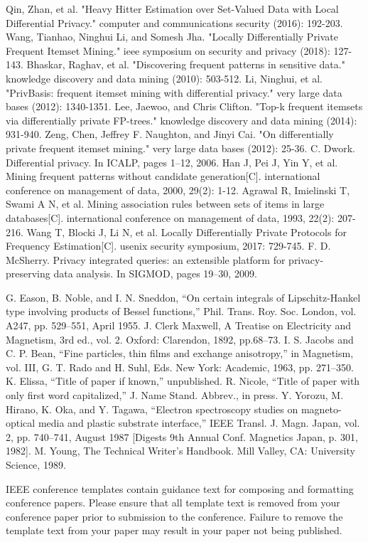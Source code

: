 \documentclass[conference]{IEEEtran}
\begin{document}
\begin{thebibliography}{00}
 Qin, Zhan, et al. "Heavy Hitter Estimation over Set-Valued Data with Local Differential Privacy." computer and communications security (2016): 192-203.
 Wang, Tianhao, Ninghui Li, and Somesh Jha. "Locally Differentially Private Frequent Itemset Mining." ieee symposium on security and privacy (2018): 127-143.
 Bhaskar, Raghav, et al. "Discovering frequent patterns in sensitive data." knowledge discovery and data mining (2010): 503-512.
 Li, Ninghui, et al. "PrivBasis: frequent itemset mining with differential privacy." very large data bases (2012): 1340-1351.
 Lee, Jaewoo, and Chris Clifton. "Top-k frequent itemsets via differentially private FP-trees." knowledge discovery and data mining (2014): 931-940.
 Zeng, Chen, Jeffrey F. Naughton, and Jinyi Cai. "On differentially private frequent itemset mining." very large data bases (2012): 25-36.
 C. Dwork. Differential privacy. In ICALP, pages 1–12, 2006.
 Han J, Pei J, Yin Y, et al. Mining frequent patterns without candidate generation[C]. international conference on management of data, 2000, 29(2): 1-12.
 Agrawal R, Imielinski T, Swami A N, et al. Mining association rules between sets of items in large databases[C]. international conference on management of data, 1993, 22(2): 207-216.
 Wang T, Blocki J, Li N, et al. Locally Differentially Private Protocols for Frequency Estimation[C]. usenix security symposium, 2017: 729-745.
 F. D. McSherry. Privacy integrated queries: an extensible platform for privacy-preserving data
analysis. In SIGMOD, pages 19–30, 2009.


 G. Eason, B. Noble, and I. N. Sneddon, ``On certain integrals of Lipschitz-Hankel type involving products of Bessel functions,'' Phil. Trans. Roy. Soc. London, vol. A247, pp. 529--551, April 1955.
 J. Clerk Maxwell, A Treatise on Electricity and Magnetism, 3rd ed., vol. 2. Oxford: Clarendon, 1892, pp.68--73.
 I. S. Jacobs and C. P. Bean, ``Fine particles, thin films and exchange anisotropy,'' in Magnetism, vol. III, G. T. Rado and H. Suhl, Eds. New York: Academic, 1963, pp. 271--350.
 K. Elissa, ``Title of paper if known,'' unpublished.
 R. Nicole, ``Title of paper with only first word capitalized,'' J. Name Stand. Abbrev., in press.
 Y. Yorozu, M. Hirano, K. Oka, and Y. Tagawa, ``Electron spectroscopy studies on magneto-optical media and plastic substrate interface,'' IEEE Transl. J. Magn. Japan, vol. 2, pp. 740--741, August 1987 [Digests 9th Annual Conf. Magnetics Japan, p. 301, 1982].
 M. Young, The Technical Writer's Handbook. Mill Valley, CA: University Science, 1989.
\end{thebibliography}
\vspace{12pt}
\color{red}
IEEE conference templates contain guidance text for composing and formatting conference papers. Please ensure that all template text is removed from your conference paper prior to submission to the conference. Failure to remove the template text from your paper may result in your paper not being published.
\end{document}
